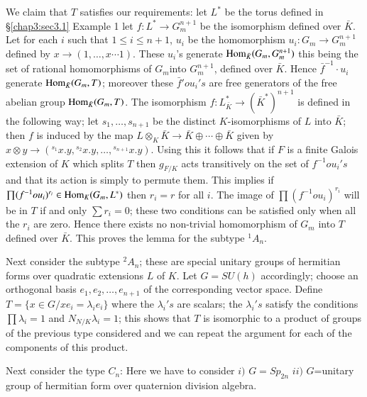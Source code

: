 We claim that $T$ satisfies our requirements: let $L^*$ be the torus
defined in \S \ref{chap3:sec3.1} Example 1 let $f : L^* \to G^{n+1}_m$ be the
isomorphism defined over $\bar{K}$. Let for each $i$ such that $1 \leq
i \leq n+1$, $u_i$ be the homomorphism $u_i : G_m \to G^{n+1}_m $
defined by $ x \to (1, \ldots, x \cdots 1)$. These $u_i$'s generate
$\operatorname{Hom}_{\bar{K}}( G_m, G^{n+1}_m)$ this being the set of rational
homomorphisms of $G_m$\pageoriginale into $G^{n+1}_m$, defined over
$\bar{K}$. Hence 
$\bar{f}^{-1} \cdot u_i$ generate  $\operatorname{Hom}_{\bar{K}}(G_m,T)$; moreover these
$\bar{f}' o u_i' s$ are free generators of the free abelian group
$\operatorname{Hom}_{\bar{K}}(G_m,T)$. The isomorphism $f: L^*_{\bar{K}} \to
(\bar{K}^*)^{n+1}$ is defined in the following way; let $s_1,
\ldots,s_{n+1}$ be the distinct $K$-isomorphisms of $L$ into $\bar{K}$;
then $f$ is induced by the map $L \otimes_K \bar{K} \to \bar{K} \oplus \cdots
\oplus \bar{K}$ given by $x \otimes y \to ({}^{s_1}x.y,
{}^{s_2} x.y,\ldots, {}^{s_{n+1}} x.y)$. Using this it follows
that if $F$ is a finite Galois extension of $K$ which splits $T$ then
$g_{F/K}$ acts transitively on the set of $f^{-1} o u_i's$ and that its
action is simply to permute them. This implies if $\prod ( f^{-1} o
u_i)^{r_i} \in \operatorname{Hom}_K(G_m,L^*)$ then $r_i = r$ for all $i$. The image of
$\prod ( f^{-1} o u_i)^{r_i}$ will be in $T$ if and only $\sum r_i =
0$; these two conditions can be satisfied only when all the $r_i$ are
zero.
  Hence there exists no non-trivial homomorphism of $G_m$ into $T$
defined over $\bar{K}$. This proves the lemma for the subtype ${}^1
A_n$.  

Next consider the subtype ${}^2 A_n$; these are special unitary groups
of hermitian forms over quadratic extensions $L$ of $K$. Let $G =
SU(h)$ accordingly; choose an orthogonal basis $e_1, e_2, \ldots,
e_{n+1}$ of the corresponding vector space. Define  $T = \{ x \in G
/xe_i = \lambda_i e_i \}$ where the $\lambda_i's$ are scalars; the
$\lambda_i's$ satisfy the conditions $\prod \lambda_i = 1$ and
$N_{N/K}\lambda_i =1$; this shows that $T$ is isomorphic to a product
of groups of the previous type considered and we can repeat the
argument for each of the components of this product. 

Next consider the type $C_n$: Here we have to consider  $i)$ $G =
Sp_{2n}$ $ii)$ $G$=unitary group of hermitian form over quaternion
division algebra. 

